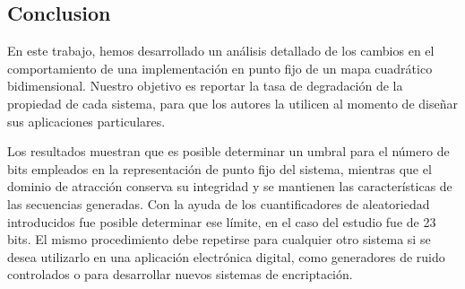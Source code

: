\subsection{Conclusion} \label{sec:conclusions}

En este trabajo, hemos desarrollado un análisis detallado de los cambios en el comportamiento de una implementación en punto fijo de un mapa cuadrático bidimensional.
Nuestro objetivo es reportar la tasa de degradación de la propiedad de cada sistema, para que los autores la utilicen al momento de diseñar sus aplicaciones particulares.

Los resultados muestran que es posible determinar un umbral para el número de bits empleados en la representación de punto fijo del sistema, mientras que el dominio de atracción conserva su integridad y se mantienen las características de las secuencias generadas.
Con la ayuda de los cuantificadores de aleatoriedad introducidos fue posible determinar ese límite, en el caso del estudio fue de 23 bits.
El mismo procedimiento debe repetirse para cualquier otro sistema si se desea utilizarlo en una aplicación electrónica digital, como generadores de ruido controlados o para desarrollar nuevos sistemas de encriptación.
